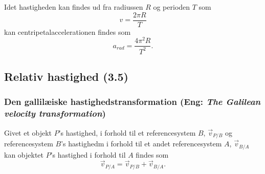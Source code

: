 Idet hastigheden kan findes ud fra radiussen $R$ og perioden $T$ som
\[ 
v = \frac{2\pi R}{T}
\]
kan centripetalaccelerationen findes som
\[ 
a_{rad} = \frac{4\pi^2R}{T^2}
.\]

\subsection{Relativ hastighed (3.5)}

\subsubsection{Den gallilæiske hastighedstransformation (Eng: \textit{The Galilean velocity transformation})} \label{afs:hastrans}

Givet et objekt $P$'s hastighed, i forhold til et referencesystem $B$, $\Vec{v}_{P / B}$ og referencesystem $B$'s hastighedm i forhold til et andet referencesystem $A$, $\Vec{v}_{B / A}$ kan objektet $P$'s hastighed i forhold til $A$ findes som
\[ 
\Vec{v}_{P / A} = \Vec{v}_{P / B} + \Vec{v}_{B / A}
.\]

